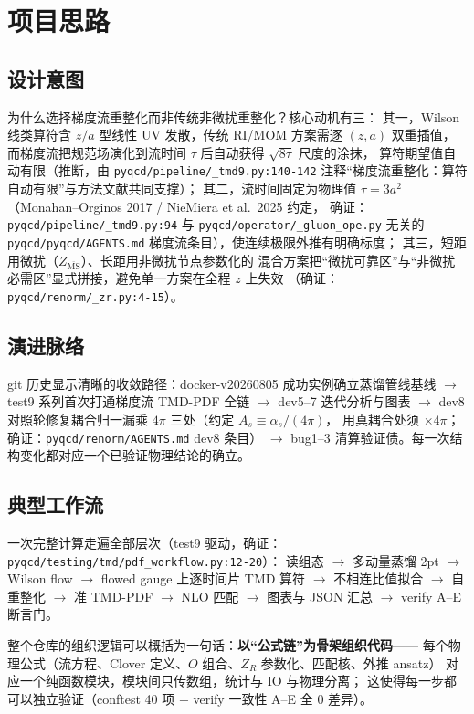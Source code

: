 \documentclass[UTF8]{ctexart}
\begin{document}
\section{项目思路}

\subsection{设计意图}
为什么选择梯度流重整化而非传统非微扰重整化？核心动机有三：
其一，Wilson 线类算符含 $z/a$ 型线性 UV 发散，传统 RI/MOM 方案需逐 $(z,a)$ 双重插值，
而梯度流把规范场演化到流时间 $\tau$ 后自动获得 $\sqrt{8\tau}$ 尺度的涂抹，
算符期望值自动有限（推断，由 \texttt{\nolinkurl{pyqcd/pipeline/_tmd9.py:140-142}}
注释``梯度流重整化：算符自动有限''与方法文献共同支撑）；
其二，流时间固定为物理值 $\tau=3a^2$（Monahan--Orginos 2017 / NieMiera et al.\ 2025 约定，
确证：\texttt{\nolinkurl{pyqcd/pipeline/_tmd9.py:94}} 与
\texttt{\nolinkurl{pyqcd/operator/_gluon_ope.py}} 无关的
\texttt{\nolinkurl{pyqcd/pyqcd/AGENTS.md}} 梯度流条目），使连续极限外推有明确标度；
其三，短距用微扰（$Z_{\overline{\mathrm{MS}}}$）、长距用非微扰节点参数化的
混合方案把``微扰可靠区''与``非微扰必需区''显式拼接，避免单一方案在全程 $z$ 上失效
（确证：\texttt{\nolinkurl{pyqcd/renorm/_zr.py:4-15}}）。

\subsection{演进脉络}
git 历史显示清晰的收敛路径：docker-v20260805 成功实例确立蒸馏管线基线 $\to$
test9 系列首次打通梯度流 TMD-PDF 全链 $\to$ dev5--7 迭代分析与图表
$\to$ dev8 对照轮修复耦合归一漏乘 $4\pi$ 三处（约定 $A_s\equiv\alpha_s/(4\pi)$，
用真耦合处须 $\times 4\pi$；确证：\texttt{\nolinkurl{pyqcd/renorm/AGENTS.md}} dev8 条目）
$\to$ bug1--3 清算验证债。每一次结构变化都对应一个已验证物理结论的确立。

\subsection{典型工作流}
一次完整计算走遍全部层次（test9 驱动，确证：
\texttt{\nolinkurl{pyqcd/testing/tmd/pdf_workflow.py:12-20}}）：
读组态 $\to$ 多动量蒸馏 2pt $\to$ Wilson flow $\to$ flowed gauge 上逐时间片 TMD 算符
$\to$ 不相连比值拟合 $\to$ 自重整化 $\to$ 准 TMD-PDF $\to$ NLO 匹配 $\to$
图表与 JSON 汇总 $\to$ verify A--E 断言门。

\begin{ideabox}
整个仓库的组织逻辑可以概括为一句话：\textbf{以``公式链''为骨架组织代码}——
每个物理公式（流方程、Clover 定义、$O$ 组合、$Z_R$ 参数化、匹配核、外推 ansatz）
对应一个纯函数模块，模块间只传数组，统计与 IO 与物理分离；
这使得每一步都可以独立验证（conftest 40 项 + verify 一致性 A--E 全 0 差异）。
\end{ideabox}
\end{document}

